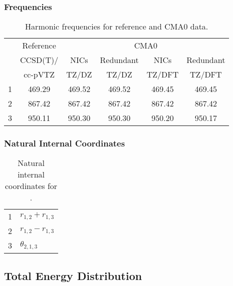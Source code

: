 \documentclass[10pt,oneside]{article}
\begin{document}
\begin{table}[h!]
\subsubsection*{Frequencies}
\centering
\caption{Harmonic frequencies for reference and CMA0 data.}
\begin{tabular}{cccccc}
\toprule
{} & Reference & \multicolumn{4}{c}{CMA0} \\
{} &  CCSD(T)/ &   NICs &  Redundant &   NICs & Redundant \\
{} &   cc-pVTZ &  TZ/DZ &      TZ/DZ & TZ/DFT &    TZ/DFT \\
\midrule
1 &    469.29 & 469.52 &     469.52 & 469.45 &    469.45 \\
2 &    867.42 & 867.42 &     867.42 & 867.42 &    867.42 \\
3 &    950.11 & 950.30 &     950.30 & 950.20 &    950.17 \\
\bottomrule
\end{tabular}
\end{table}

\begin{table}[h!]
\subsubsection*{Natural Internal Coordinates}
\centering
\caption{Natural internal coordinates for .}
\small
\begin{tabular}{ll}
\toprule
  1   & $r_{1,2} + r_{1,3}$ \\
  2   & $r_{1,2} - r_{1,3}$ \\
  3   & $\theta_{2,1,3}$ \\
\bottomrule
\end{tabular}
\end{table}

\begin{table}
\subsection*{Total Energy Distribution}
\centering\end{table}

\clearpage

\subsection{}
\end{document}
